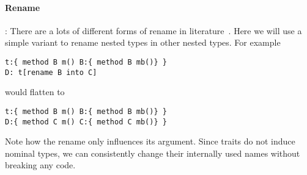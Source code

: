 \paragraph{Rename}:
There are a lots of different forms of rename in
literature~\cite{}.
Here we will use a simple variant to rename nested types in other nested types.
For example 
\begin{lstlisting}
t:{ method B m() B:{ method B mb()} }
D: t[rename B into C]
\end{lstlisting}
would flatten to 
\begin{lstlisting}
t:{ method B m() B:{ method B mb()} }
D:{ method C m() C:{ method C mb()} }
\end{lstlisting}
Note how the rename only influences its argument.
Since traits do not induce nominal types, we can
consistently change their
internally used names without breaking any code.

%
%
% 
%



